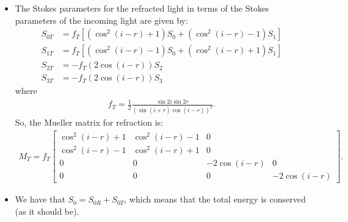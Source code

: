 \documentclass[10pt]{article}
\begin{document}
\begin{itemize}
		\item The Stokes parameters for the refracted light in terms of the Stokes parameters of the incoming light are given by:
		\begin{align*}
			S_{0T} &= f_T[(\cos^2(i-r) + 1)S_0 + (\cos^2 (i-r) - 1) S_1]\\
			S_{1T} &= f_T[(\cos^2(i-r) - 1)S_0 + (\cos^2 (i-r) + 1) S_1] \\
			S_{2T} &= -f_T(2\cos(i-r)) S_2 \\
			S_{3T} &= -f_T(2\cos(i-r)) S_3 
		\end{align*}
		where
		\begin{align*}
			f_T = \frac{1}{2} \frac{\sin 2i \sin 2r}{(\sin(i+r)\cos(i-r))^2}.
		\end{align*}
		So, the Mueller matrix for refraction is:
		\begin{align*}
			M_T = f_T \begin{bmatrix}
				\cos^2(i-r)+1 & \cos^2(i-r)-1 & 0 & \\
				\cos^2(i-r)-1 & \cos^2(i-r)+1 & 0 & \\
				0 & 0 & -2\cos(i-r) & 0 \\
				0 & 0 & 0 & -2\cos(i-r)
			\end{bmatrix}.
		\end{align*}

		\item We have that $S_0 = S_{0R} + S_{0T}$, which means that the total energy is conserved (as it should be).


\end{itemize}
\end{document}
